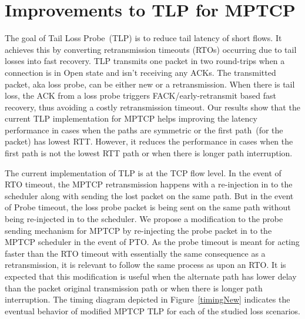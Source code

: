 \documentclass[10pt,conference,compsoc]{IEEEtran}
\begin{document}


\section{Improvements to TLP for MPTCP}\label{impr}
The goal of Tail Loss Probe~(TLP) is to reduce tail latency of short flows. It achieves this by converting retransmission timeouts (RTOs) occurring due to tail losses into fast recovery. TLP transmits one packet in two round-trips when a connection is in Open state and isn't receiving any ACKs. The transmitted packet, aka loss probe, can be either new or a retransmission. When there is tail loss, the ACK from a loss probe triggers FACK/early-retransmit based fast recovery, thus avoiding a costly retransmission timeout. Our results show that the current TLP implementation for MPTCP helps improving the latency performance in cases when the paths are symmetric or the first path~(for the packet) has lowest RTT. However, it reduces the performance in cases when the first path is not the lowest RTT path or when there is longer path interruption.

The current implementation of TLP is at the TCP flow level. In the event of RTO timeout, the MPTCP retransmission happens with a re-injection in to the scheduler along with sending the lost packet on the same path. But in the event of Probe timeout, the loss probe packet is being sent on the same path without being re-injected in to the scheduler. We propose a modification to the probe sending mechanism for MPTCP by re-injecting the probe packet in to the MPTCP scheduler in the event of PTO. As the probe timeout is meant for acting faster than the RTO timeout with essentially the same consequence as a retransmission, it is relevant to follow the same process as upon an RTO. It is expected that this modification is useful when the alternate path has lower delay than the packet original transmission path or when there is longer path interruption. The timing diagram depicted in Figure~\ref{timingNew} indicates the eventual behavior of modified MPTCP TLP for each of the studied loss scenarios.
\end{document}
